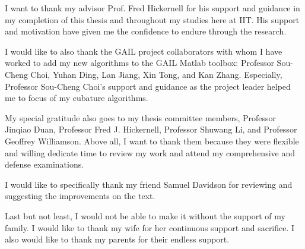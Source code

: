 \documentclass{iitthesis}          %
\begin{document}
\begin{acknowledgement}     %
	\par  I want to thank my advisor Prof. Fred Hickernell for his support and guidance in my completion of this thesis and throughout my studies here at IIT. 
	His support and motivation have given me the confidence to endure through the research. 
	
	I would like to also thank the GAIL project collaborators with
	whom I have worked to add my new algorithms to the GAIL Matlab toolbox: Professor Sou-Cheng Choi,
	Yuhan Ding, Lan Jiang, Xin Tong, and Kan Zhang. Especially, Professor Sou-Cheng Choi’s support and guidance as the project leader helped me to focus of my cubature algorithms.
	
	My special gratitude also goes to my thesis committee members, Professor Jinqiao Duan,
	Professor Fred J. Hickernell, Professor Shuwang Li, and Professor Geoffrey Williamson. Above all, I want to thank them because they were flexible and willing dedicate time to review my work and attend my comprehensive and defense examinations.
	
	I would like to specifically thank my friend Samuel Davidson for reviewing and suggesting the improvements on the text.
	
	Last but not least, I would not be able to make it without the support of my family. I would like to thank my wife for her continuous support and sacrifice. I also would like to thank my parents for their endless support.
	
\end{acknowledgement}

\tableofcontents

\clearpage

\listoftables

\clearpage

\listoffigures

\clearpage
\end{document}
